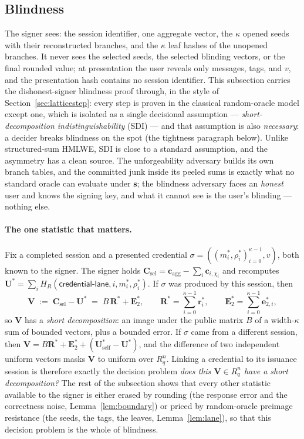 \documentclass[11pt]{article}
\newcommand{\R}{R_q}
\begin{document}
\subsection{Blindness}
\label{sec:blindness}

The signer sees: the session identifier, one aggregate vector, the $\kappa$
opened seeds with their reconstructed branches, and the $\kappa$ leaf hashes
of the unopened branches.  It never sees the selected seeds, the selected
blinding vectors, or the final rounded value; at presentation the user
reveals only messages, tags, and $v$, and the presentation hash contains no
session identifier.  This subsection carries the dishonest-signer blindness
proof through, in the style of Section~\ref{sec:latticestep}: every step is
proven in the classical random-oracle model except one, which is isolated as
a single decisional assumption --- \emph{short-decomposition
indistinguishability} (SDI) --- and that assumption is also \emph{necessary}:
a decider breaks blindness on the spot (the tightness paragraph below).
Unlike structured-sum HMLWE, SDI is close to a standard assumption, and the
asymmetry has a clean source.  The unforgeability adversary builds its own
branch tables, and the committed junk inside its peeled sums is exactly what
no standard oracle can evaluate under $\mathbf s$; the blindness adversary
faces an \emph{honest} user and knows the signing key, and what it cannot
see is the user's blinding --- nothing else.

\paragraph{The one statistic that matters.}
Fix a completed session and a presented credential
$\sigma=((m_i^*,\rho_i^*)_{i=0}^{\kappa-1},v)$, both known to the signer.
The signer holds
$\mathbf C_{\mathrm{sel}}=\mathbf c_{\mathrm{agg}}-\sum_i\mathbf c_{i,\chi_i}$
and recomputes
$\mathbf U^*=\sum_i H_R(\mathsf{credential\mbox{-}lane},i,m_i^*,\rho_i^*)$.
If $\sigma$ was produced by this session, then
\[
 \mathbf V\;:=\;\mathbf C_{\mathrm{sel}}-\mathbf U^*
 \;=\;B\,\mathbf R^*+\mathbf E_2^*,
 \qquad
 \mathbf R^*=\sum_{i=0}^{\kappa-1}\mathbf r_i^*,
 \qquad
 \mathbf E_2^*=\sum_{i=0}^{\kappa-1}\mathbf e_{2,i}^*,
\]
so $\mathbf V$ has a \emph{short decomposition}: an image under the public
matrix $B$ of a width-$\kappa$ sum of bounded vectors, plus a bounded error.
If $\sigma$ came from a different session, then
$\mathbf V=B\mathbf R^*+\mathbf E_2^*
 +(\mathbf U^*_{\mathrm{self}}-\mathbf U^*)$,
and the difference of two independent uniform vectors masks $\mathbf V$ to
uniform over $\R^{n}$.  Linking a credential to its issuance session is
therefore exactly the decision problem \emph{does this $\mathbf V\in\R^{n}$
have a short decomposition?}  The rest of the subsection shows that every
other statistic available to the signer is either erased by rounding (the
response error and the correctness noise, Lemma~\ref{lem:boundary}) or
priced by random-oracle preimage resistance (the seeds, the tags, the
leaves, Lemma~\ref{lem:lane}), so that this decision problem is the whole
of blindness.
\end{document}
